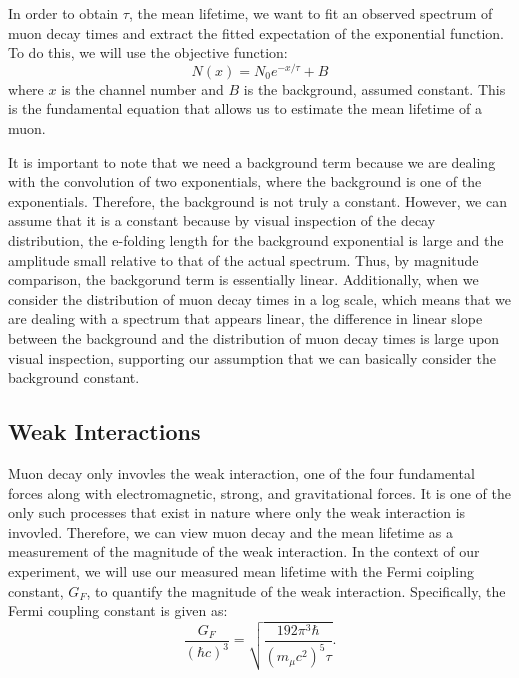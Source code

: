 \documentclass[
    aps, 
    twocolumn, 
    secnumarabic, 
    balancelastpage, 
    amsmath, 
    amssymb, 
    nofootinbib, 
    floatfix
]{revtex4-2}
\begin{document}
In order to obtain $\tau$, the mean lifetime, we want to fit an observed spectrum of muon decay times and extract the fitted expectation of the exponential function. To do this, we will use the objective function:
\begin{equation}
	N(x) = N_0 e^{-x/\tau} + B
	\label{eq:specFit}
\end{equation}
where $x$ is the channel number and $B$ is the background, assumed constant. This is the fundamental equation that allows us to estimate the mean lifetime of a muon.

It is important to note that we need a background term  because we are dealing with the convolution of two exponentials, where the background is one of the exponentials. Therefore, the background is not truly a constant. However, we can assume that it is a constant because by visual inspection of the decay distribution, the e-folding length for the background exponential is large and the amplitude small relative to that of the actual spectrum. Thus, by magnitude comparison, the backgorund term is essentially linear. Additionally, when we consider the distribution of muon decay times in a log scale, which means that we are dealing with a spectrum that appears linear, the difference in linear slope between the background and the distribution of muon decay times is large upon visual inspection, supporting our assumption that we can basically consider the background constant.

\subsection{Weak Interactions}
\label{sec:fermiConstant}

Muon decay only invovles the weak interaction, one of the four fundamental forces along with electromagnetic, strong, and gravitational forces. It is one of the only such processes that exist in nature where only the weak interaction is invovled. Therefore, we can view muon decay and the mean lifetime as a measurement of the magnitude of the weak interaction. In the context of our experiment, we will use our measured mean lifetime with the Fermi coipling constant, $G_F$, to quantify the magnitude of the weak interaction. Specifically, the Fermi coupling constant is given as: 
\begin{equation}
	\dfrac{G_F}{\left(\hbar c\right)^3} = \sqrt{\dfrac{192\pi^3\hbar}{\left(m_\mu c^2\right)^5\tau}}.
	\label{eq:fermi}
\end{equation}
\end{document}

